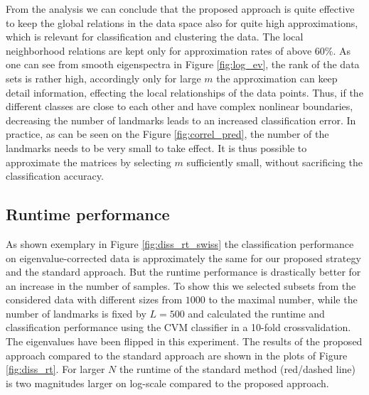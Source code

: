 \documentclass[twoside,11pt]{article}
\begin{document}
From the analysis we can conclude that the proposed approach is quite effective to keep the global relations in the data space
also for quite high approximations, which is relevant for classification and clustering the data. The local neighborhood relations 
are kept only for approximation rates of above $60\%$. As one can see from smooth eigenspectra in Figure \ref{fig:log_ev}, the 
rank of the data sets is rather high, accordingly only for large $m$ the approximation can keep detail information, effecting the
local relationships of the data points. Thus, if the different classes are close to each other
and have complex nonlinear boundaries,
decreasing the number of landmarks
leads to an increased classification error.
In practice, as can be seen on the Figure \ref{fig:correl_pred},
the number of the landmarks needs to be very small to take effect.
It is thus possible to approximate the matrices
by selecting $m$ sufficiently small,
without sacrificing the classification accuracy.

\subsection{Runtime performance}
As shown exemplary in Figure \ref{fig:diss_rt_swiss} the classification performance on eigenvalue-cor\-rected data is approximately 
the same for our proposed strategy and the standard approach.
But the runtime performance is  drastically better for an 
increase in the number of samples.
To show this we selected subsets from the considered data with different sizes
from $1000$ to the maximal number, while the number of landmarks is fixed by $L=500$ and calculated the runtime and classification
performance using the CVM classifier in a 10-fold crossvalidation. The eigenvalues have been flipped in this experiment.
The results of the proposed approach compared to the standard approach are shown in the plots of Figure \ref{fig:diss_rt}. 
For larger $N$ the runtime of the standard method (red/dashed line) is two magnitudes larger on log-scale compared to the proposed approach.
\end{document}
